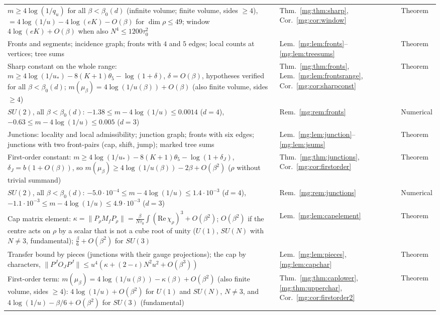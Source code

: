 \documentclass[11pt,a4paper]{article}
\theoremstyle{definition}
\theoremstyle{remark}
\newcommand{\norm}[1]{\lVert #1\rVert}
\begin{document}
\begin{longtable}{@{}p{}p{}p{}@{}}
$m\ge4\log(1/q_u)$ for all $\beta<\beta_0(d)$ (infinite volume; finite volume, sides $\ge4$), $=4\log(1/u)-4\log(eK)-O(\beta)$ for $\dim\rho\le49$; window $4\log(eK)+O(\beta)$ when also $N^4\le1200\tau_0^2$ & Thm.~\ref{mg:thm:sharp}, Cor.~\ref{mg:cor:window} & Theorem\\
Fronts and segments; incidence graph; fronts with $4$ and $5$ edges; local counts at vertices; tree sums & Lem.~\ref{mg:lem:fronts}--\ref{mg:lem:treesums} & Theorem\\
Sharp constant on the whole range: $m\ge4\log(1/u_*)-8(K+1)\theta_5-\log(1+\delta)$, $\delta=O(\beta)$, hypotheses verified for all $\beta<\beta_0(d)$; $m(\mu_\beta)=4\log(1/u(\beta))+O(\beta)$ (also finite volume, sides $\ge4$) & Thm.~\ref{mg:thm:fronts}, Lem.~\ref{mg:lem:frontsrange}, Cor.~\ref{mg:cor:sharpconst} & Theorem\\
$SU(2)$, all $\beta<\beta_0(d)$: $-1.38\le m-4\log(1/u)\le0.0014$ ($d=4$), $-0.63\le m-4\log(1/u)\le0.005$ ($d=3$) & Rem.~\ref{mg:rem:fronts} & Numerical\\
Junctions: locality and local admissibility; junction graph; fronts with six edges; junctions with two front-pairs (cap, shift, jump); marked tree sums & Lem.~\ref{mg:lem:junction}--\ref{mg:lem:jsums} & Theorem\\
First-order constant: $m\ge4\log(1/u_*)-8(K+1)\theta_5-\log(1+\delta_J)$, $\delta_J=b(1+O(\beta))$, so $m(\mu_\beta)\ge4\log(1/u(\beta))-2\beta+O(\beta^2)$ ($\rho$ without trivial summand) & Thm.~\ref{mg:thm:junctions}, Cor.~\ref{mg:cor:firstorder} & Theorem\\
$SU(2)$, all $\beta<\beta_0(d)$: $-5.0\cdot10^{-4}\le m-4\log(1/u)\le1.4\cdot10^{-3}$ ($d=4$), $-1.1\cdot10^{-3}\le m-4\log(1/u)\le4.9\cdot10^{-3}$ ($d=3$) & Rem.~\ref{mg:rem:junctions} & Numerical\\
Cap matrix element: $\kappa=\norm{P_\rho M_fP_\rho}=\frac\beta{N\tau_0}\int(\mathrm{Re}\,\chi_\rho)^3+O(\beta^2)$; $O(\beta^2)$ if the centre acts on $\rho$ by a scalar that is not a cube root of unity ($U(1)$, $SU(N)$ with $N\ne3$, fundamental); $\frac\beta6+O(\beta^2)$ for $SU(3)$ & Lem.~\ref{mg:lem:capelement} & Theorem\\
Transfer bound by pieces (junctions with their gauge projections); the cap by characters, $\norm{P^JO_JP^J}\le u^4(\kappa+(2-\iota)N^2u^2+O(\beta^3))$ & Lem.~\ref{mg:lem:pieces}, \ref{mg:lem:capchar} & Theorem\\
First-order term: $m(\mu_\beta)=4\log(1/u(\beta))-\kappa(\beta)+O(\beta^2)$ (also finite volume, sides $\ge4$): $4\log(1/u)+O(\beta^2)$ for $U(1)$ and $SU(N)$, $N\ne3$, and $4\log(1/u)-\beta/6+O(\beta^2)$ for $SU(3)$ (fundamental) & Thm.~\ref{mg:thm:caplower}, \ref{mg:thm:upperchar}, Cor.~\ref{mg:cor:firstorder2} & Theorem\\

\end{longtable}
\end{document}
